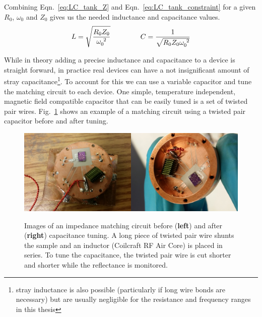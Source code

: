 Combining Eqn.~\ref{eq:LC_tank_Z} and Eqn.~\ref{eq:LC_tank_constraint} for a given $R_0$, $\omega_0$ and $Z_0$ gives us the needed inductance and capacitance values.
\begin{equation}\label{eq:LC_tank_LC}
L = \sqrt{\frac{R_0Z_0}{\omega_0^{~2}}}
\hspace{15mm}
C = \frac{1}{\sqrt{R_0Z_0\omega_0^{~2}}}
\end{equation}

While in theory adding a precise inductance and capacitance to a device is straight forward, in practice real devices can have a not insignificant amount of stray capacitance\footnote{stray inductance is also possible (particularly if long wire bonds are necessary) but are usually negligible for the resistance and frequency ranges in this thesis}. To account for this we can use a variable capacitor and tune the matching circuit to each device. One simple, temperature independent, magnetic field compatible capacitor that can be easily tuned is a set of twisted pair wires. Fig.~\ref{fig:picture_gimmicks} shows an example of a matching circuit using a twisted pair capacitor before and after tuning.
\begin{figure}
\centering
\includegraphics[width=0.5\textwidth]{figures/Johnson_noise_thermometry/picture_gimmick1.jpg}\includegraphics[width=0.5\textwidth]{figures/Johnson_noise_thermometry/picture_gimmick2.jpg}
\caption{Images of an impedance matching circuit before (\textbf{left}) and after (\textbf{right}) capacitance tuning. A long piece of twisted pair wire shunts the sample and an inductor (Coilcraft RF Air Core) is placed in series. To tune the capacitance, the twisted pair wire is cut shorter and shorter while the reflectance is monitored.}
\label{fig:picture_gimmicks}
\end{figure} 

